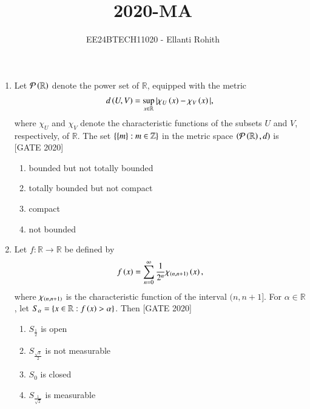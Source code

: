 \documentclass[journal,12pt,onecolumn]{IEEEtran}
\theoremstyle{remark}
\begin{document}

\vspace{3cm}

\title{2020-MA}
\author{EE24BTECH11020 -  Ellanti Rohith}
\maketitle

\renewcommand{\thefigure}{\theenumi}
\renewcommand{\thetable}{\theenumi}
\begin{enumerate}
    \item  Let $\mathcal{P}\left(\mathbb{R}\right)$ denote the power set of $\mathbb{R}$, equipped with the metric
    \begin{align*}
    d\left(U, V\right) = \sup_{x \in \mathbb{R}} | \chi_U\left(x\right) - \chi_V\left(x\right) |,
    \end{align*}
    where $\chi_U$ and $\chi_V$ denote the characteristic functions of the subsets $U$ and $V$, respectively, of $\mathbb{R}$. The set $\left\{\left\{m\right\} : m \in \mathbb{Z}\right\}$ in the metric space $\left(\mathcal{P}\left(\mathbb{R}\right), d\right)$ is
    \hfill{[GATE 2020]}\begin{multicols}{2}\begin{enumerate}
        \item bounded but not totally bounded
        \item totally bounded but not compact
        \item compact
        \item not bounded
    \end{enumerate}\end{multicols}

    \item  Let $f : \mathbb{R} \to \mathbb{R}$ be defined by
    \begin{align*}
    f\left(x\right) = \sum_{n=0}^{\infty} \frac{1}{2^n} \chi_{\left(n, n+1\right)}\left(x\right),
    \end{align*}
    where $\chi_{\left(n, n+1\right)}$ is the characteristic function of the interval $(n, n+1]$. For $\alpha \in \mathbb{R}$, let $S_\alpha = \left\{ x \in \mathbb{R} : f\left(x\right) > \alpha \right\}$. Then
    \hfill{[GATE 2020]}\begin{multicols}{2}\begin{enumerate}
        \item $S_{\frac{1}{2}}$ is open
        \item $S_{\frac{\sqrt{3}}{2}}$ is not measurable
        \item $S_0$ is closed
        \item $S_{\frac{1}{\sqrt{2}}}$ is measurable
    \end{enumerate}\end{multicols}


\end{enumerate}
\end{document}
